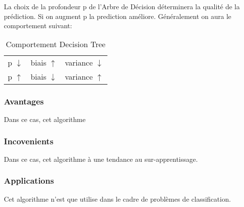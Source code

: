 \documentclass{article}
\begin{document}
La choix de la profondeur p de l'Arbre de Décision déterminera la qualité de la prédiction. Si on augment p la prediction améliore. Généralement on aura le comportement suivant:
\begin{table}[H]
    \centering\begin{tabular}{lll}
        p $\downarrow$ & biais $\uparrow  $ & variance $\downarrow$\\
        p $\uparrow$   & biais $\downarrow$ & variance $\uparrow$\\
    \end{tabular}
    \caption{Comportement Decision Tree}
\end{table}

\subsubsection{Avantages}
Dans ce cas, cet algorithme 

\subsubsection{Incovenients}
Dans ce cas, cet algorithme à une tendance au sur-apprentissage.

\subsubsection{Applications}
Cet algorithme n'est que utilise dans le cadre de problèmes de classification.




\end{document}
